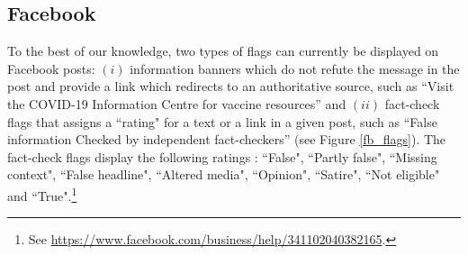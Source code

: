\documentclass{article}
\begin{document}
\subsection{Facebook}

To the best of our knowledge, two types of flags can currently be displayed on Facebook posts: 
$(i)$ information banners which do not refute the message in the post and provide a link which redirects to an authoritative source, such as ``Visit the COVID-19 Information Centre for vaccine resources'' and $(ii)$ fact-check flags that assigns a ``rating" for a text or a link in a given post, such as ``False information Checked by independent fact-checkers'' (see Figure \ref{fb_flags}). The fact-check flags display the following ratings : ``False", ``Partly false", ``Missing context", ``False headline", ``Altered media", ``Opinion", ``Satire", ``Not eligible" and ``True".\footnote{See \href{https://www.facebook.com/business/help/341102040382165}{https://www.facebook.com/business/help/341102040382165}.}
\end{document}
